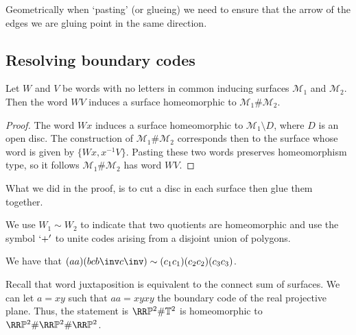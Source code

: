 \documentclass[12pt, a4paper]{article}
\begin{document}
\begin{mdnote}
    Geometrically when `pasting' (or glueing) we need to ensure that the arrow of the edges we are gluing point in the same direction.
\end{mdnote}

\subsection{Resolving boundary codes}

\begin{proposition}
    Let \(W\) and \(V\) be words with no letters in common inducing surfaces \(\mathcal{M}_1\) and \(\mathcal{M}_2\). Then the word \(WV\) induces a surface homeomorphic to \(\mathcal{M}_1 \#\mathcal{M}_2\).
\end{proposition}

\begin{proof}
    The word \( Wx \) induces a surface homeomorphic to \( \mathcal{M}_1 \setminus D \), where \( D \) is an open disc. The construction of \( \mathcal{M}_1 \# \mathcal{M}_2 \) corresponds then to the surface whose word is given by \( \{Wx, x^{-1}V\} \). Pasting these two words preserves homeomorphism type, so it follows \( \mathcal{M}_1 \# \mathcal{M}_2 \) has word \(WV \).
\end{proof}

\begin{mdnote}
    What we did in the proof, is to cut a disc in each surface then glue them together.
\end{mdnote}

We use \(W_1 \sim W_2\) to indicate that two quotients are homeomorphic and use the symbol \(`+'\) to unite codes arising from a disjoint union of polygons.

\begin{mdprop}
    We have that \((aa)(bcb\inv c\inv) \sim (c_1c_1)(c_2c_2)(c_3c_3)\).
\end{mdprop}

\begin{mdnote}
    Recall that word juxtaposition is equivalent to the connect sum of surfaces. We can let \(a=xy\) such that \(aa = xyxy\) the boundary code of the real projective plane. Thus, the statement is \(\RR\mathbb{P}^2 \# \mathbb{T}^2\) is homeomorphic to \(\RR\mathbb{P}^2 \# \RR\mathbb{P}^2 \# \RR\mathbb{P}^2\).
\end{mdnote}
\end{document}

